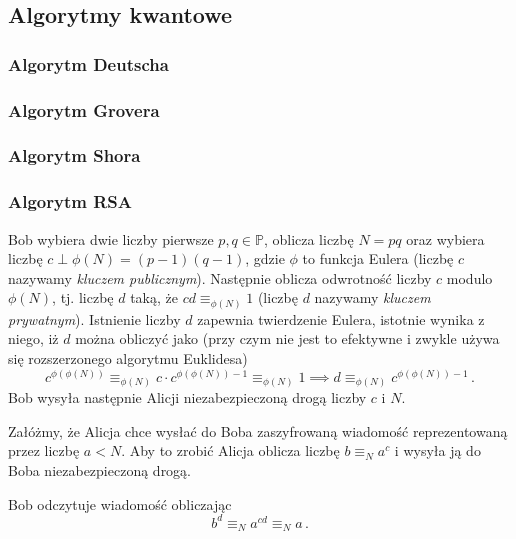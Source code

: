 \documentclass{myclass}
\begin{document}
\newpage
\subsection{Algorytmy kwantowe}

\subsubsection{Algorytm Deutscha}

\subsubsection{Algorytm Grovera}

\subsubsection{Algorytm Shora}





\subsubsection*{Algorytm RSA}

Bob wybiera dwie liczby pierwsze \(p,q\in\mathbb{P}\), oblicza liczbę \(N = pq\) oraz wybiera liczbę
\(c \perp \phi(N) = (p-1)(q-1)\), gdzie \(\phi\) to funkcja Eulera (liczbę \(c\) nazywamy
\textit{kluczem publicznym}). Następnie oblicza odwrotność liczby \(c\) modulo \(\phi(N)\), tj.
liczbę \(d\) taką, że \(cd \equiv_{\phi(N)} 1\) (liczbę \(d\) nazywamy \textit{kluczem prywatnym}).
Istnienie liczby \(d\) zapewnia twierdzenie Eulera, istotnie wynika z niego, iż \(d\) można obliczyć
jako (przy czym nie jest to efektywne i zwykle używa się rozszerzonego algorytmu Euklidesa)
\begin{equation*}
    c^{\phi(\phi(N))} \equiv_{\phi(N)} c\cdot c^{\phi(\phi(N))-1} \equiv_{\phi(N)} 1  \implies d \equiv_{\phi(N)} c^{\phi(\phi(N))-1}\,.
\end{equation*}
Bob wysyła następnie Alicji niezabezpieczoną drogą liczby \(c\) i \(N\). 

Załóżmy, że Alicja chce wysłać do Boba zaszyfrowaną wiadomość reprezentowaną przez liczbę \(a < N\).
Aby to zrobić Alicja oblicza liczbę \(b \equiv_N a^c\) i wysyła ją do Boba niezabezpieczoną drogą.

Bob odczytuje wiadomość obliczając
\begin{equation*}
    b^d \equiv_N a^{cd} \equiv_N a\,.
\end{equation*}
\end{document}

